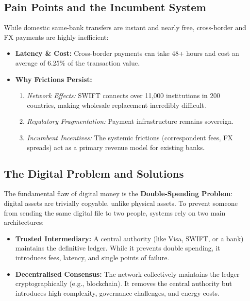 \subsection{Pain Points and the Incumbent System}
While domestic same-bank transfers are instant and nearly free, cross-border
and FX payments are highly inefficient:
\begin{itemize}
    \item \textbf{Latency \& Cost:} Cross-border payments can take 48+ hours and cost an average
          of 6.25\% of the transaction value.
    \item \textbf{Why Frictions Persist:}
          \begin{enumerate}
              \item \textit{Network Effects:} SWIFT connects over 11,000 institutions in 200 countries,
                    making wholesale replacement incredibly difficult.
              \item \textit{Regulatory Fragmentation:} Payment infrastructure remains sovereign.
              \item \textit{Incumbent Incentives:} The systemic frictions (correspondent fees, FX spreads)
                    act as a primary revenue model for existing banks.
          \end{enumerate}
\end{itemize}

\subsection{The Digital Problem and Solutions}
The fundamental flaw of digital money is the \textbf{Double-Spending Problem}: digital assets are trivially copyable, unlike
physical assets. To prevent someone from sending the same digital file to two
people, systems rely on two main architectures:
\begin{itemize}
    \item \textbf{Trusted Intermediary:} A central authority (like Visa, SWIFT, or a bank)
          maintains the definitive ledger. While it prevents double spending, it
          introduces fees, latency, and single points of failure.
    \item \textbf{Decentralised Consensus:} The network collectively maintains the ledger
          cryptographically (e.g., blockchain). It removes the central authority but
          introduces high complexity, governance challenges, and energy costs.
\end{itemize}